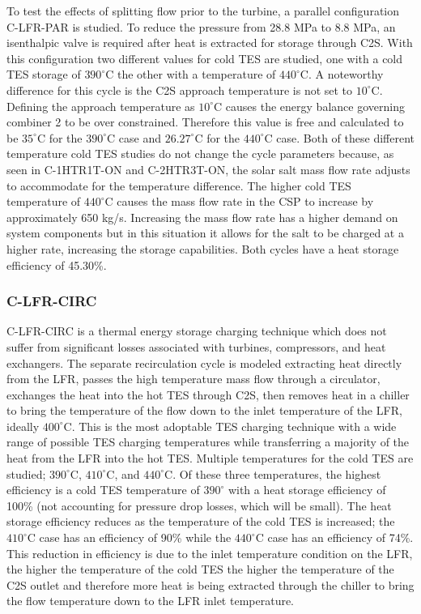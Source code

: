 \begin{paracol}{2}
To test the effects of splitting flow prior to the turbine, a parallel configuration C-LFR-PAR is studied. To reduce the pressure from 28.8 MPa to 8.8 MPa, an isenthalpic valve is required after heat is extracted for storage through C2S. With this configuration two different values for cold TES are studied, one with a cold TES storage of $390^{\circ}$C the other with a temperature of $440^{\circ}$C. A noteworthy difference for this cycle is the C2S approach temperature is not set to $10^{\circ}$C. Defining the approach temperature as $10^{\circ}$C causes the energy balance governing combiner 2 to be over constrained. Therefore this value is free and calculated to be $35^{\circ}$C for the $390^{\circ}$C case and $26.27^{\circ}$C for the $440^{\circ}$C case. Both of these different temperature cold TES studies do not change the cycle parameters because, as seen in C-1HTR1T-ON and C-2HTR3T-ON, the solar salt mass flow rate adjusts to accommodate for the temperature difference. The higher cold TES temperature of $440^{\circ}$C causes the mass flow rate in the CSP to increase by approximately 650 kg/s. Increasing the mass flow rate has a higher demand on system components but in this situation it allows for the salt to be charged at a higher rate, increasing the storage capabilities. Both cycles have a heat storage efficiency of 45.30\%.

\subsubsection{C-LFR-CIRC}

C-LFR-CIRC is a thermal energy storage charging technique which does not suffer from significant losses associated with turbines, compressors, and heat exchangers. The separate recirculation cycle is modeled extracting heat directly from the LFR, passes the high temperature mass flow through a circulator, exchanges the heat into the hot TES through C2S, then removes heat in a chiller to bring the temperature of the flow down to the inlet temperature of the LFR, ideally $400^{\circ}$C. This is the most adoptable TES charging technique with a wide range of possible TES charging temperatures while transferring a majority of the heat from the LFR into the hot TES. Multiple temperatures for the cold TES are studied; $390^{\circ}$C, $410^{\circ}$C, and $440^{\circ}$C. Of these three temperatures, the highest efficiency is a cold TES temperature of $390^{\circ}$ with a heat storage efficiency of 100\% (not accounting for pressure drop losses, which will be small). The heat storage efficiency reduces as the temperature of the cold TES is increased; the $410^{\circ}$C case has an efficiency of 90\% while the $440^{\circ}$C case has an efficiency of 74\%. This reduction in efficiency is due to the inlet temperature condition on the LFR, the higher the temperature of the cold TES the higher the temperature of the C2S outlet and therefore more heat is being extracted through the chiller to bring the flow temperature down to the LFR inlet temperature. 


\end{paracol}
